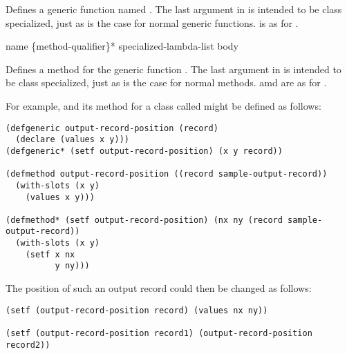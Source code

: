 Defines a  generic function named .  The last argument in
 is intended to be class specialized, just as is the case for
normal  generic functions.   is as for .

 {name \{method-qualifier\}* specialized-lambda-list \body body}

Defines a  method for the generic function .  The last
argument in  is intended to be class specialized,
just as is the case for normal  methods.  
amd  are as for .


For example,  and its  method for a class
called  might be defined as follows:

\begin{verbatim}
(defgeneric output-record-position (record)
  (declare (values x y)))
(defgeneric* (setf output-record-position) (x y record))

(defmethod output-record-position ((record sample-output-record))
  (with-slots (x y)
    (values x y)))

(defmethod* (setf output-record-position) (nx ny (record sample-output-record))
  (with-slots (x y)
    (setf x nx
          y ny)))
\end{verbatim}

The position of such an output record could then be changed as follows:

\begin{verbatim}
(setf (output-record-position record) (values nx ny))

(setf (output-record-position record1) (output-record-position record2))
\end{verbatim}

